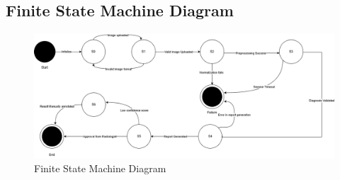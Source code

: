 \documentclass[12pt]{article}
\begin{document}
\subsection{Finite State Machine Diagram}
\begin{figure}[H]
    \centering
    \includegraphics[width=1\linewidth]{state.png}
    \caption{Finite State Machine Diagram}
    \label{fig:enter-label}
\end{figure}

\newpage
\end{document}
